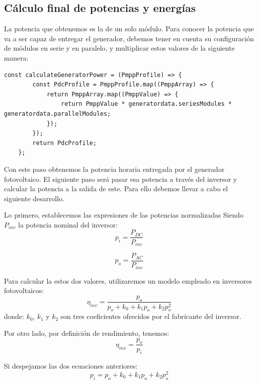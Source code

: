 \subsection{Cálculo final de potencias y energías}

La potencia que obtenemos es la de un solo módulo. Para conocer la potencia que va a ser capaz de entregar el generador, debemos tener en cuenta su configuración de módulos en serie y en paralelo, y multiplicar estos valores de la siguiente manera:

\begin{lstlisting}[style=ES6, caption={Cálculo de la potencia del generador}]
	const calculateGeneratorPower = (PmppProfile) => {
		const PdcProfile = PmppProfile.map((PmppArray) => {
			return PmppArray.map((PmppValue) => {
				return PmppValue * generatordata.seriesModules * generatordata.parallelModules;
			});
		});
		return PdcProfile;
	};

\end{lstlisting}

Con este paso obtenemos la potencia horaria entregada por el generador fotovoltaico. El siguiente paso será pasar esa potencia a través del inversor y calcular la potencia a la salida de este. Para ello debemos llevar a cabo el siguiente desarrollo.

Lo primero, establecemos las expresiones de las potencias normalizadas Siendo $P_{inv}$ la potencia nominal del inversor:
\begin{equation}
\label{eqn:p_i}
p_i = \frac{P_{DC}}{P_{inv}}
\end{equation}

\begin{equation}
\label{eqn:p_o}
p_o = \frac{P_{AC}}{P_{inv}}
\end{equation}

Para calcular la estos dos valores, utilizaremos un modelo empleado en inversores fotovoltaicos:
\begin{equation}
\eta_{inv} = \frac{p_o}{p_o + k_0 + k_1 p_o + k_2 p_o^2}
\end{equation}
donde: $k_0$, $k_1$ y $k_2$ son tres coeficientes ofrecidos por el fabricante del inversor.

Por otro lado, por definición de rendimiento, tenemos:
\begin{equation}
\eta_{inv} = \frac{p_o}{p_i}
\end{equation}

Si despejamos las dos ecuaciones anteriores:
\begin{equation}
p_i = p_o + k_0 + k_1p_o + k_2p_o^2
\end{equation}

